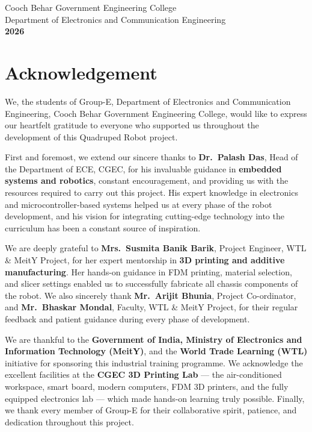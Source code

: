 \documentclass[12pt, a4paper]{article}
\begin{document}
\begin{center}
\vspace{0.3cm}
{\small Cooch Behar Government Engineering College}\\[2pt]
{\small Department of Electronics and Communication Engineering}\\[4pt]
{\normalsize\bfseries 2026}

\end{center}
\newpage
\thispagestyle{fancy}

\section*{\color{myred}Acknowledgement}

We, the students of Group-E, Department of Electronics and Communication
Engineering, Cooch Behar Government Engineering College, would like to express
our heartfelt gratitude to everyone who supported us throughout the development
of this Quadruped Robot project.

First and foremost, we extend our sincere thanks to \textbf{Dr.\ Palash Das},
Head of the Department of ECE, CGEC, for his invaluable guidance in
\textbf{embedded systems and robotics}, constant encouragement, and providing
us with the resources required to carry out this project. His expert knowledge
in electronics and microcontroller-based systems helped us at every phase of
the robot development, and his vision for integrating cutting-edge technology
into the curriculum has been a constant source of inspiration.

We are deeply grateful to \textbf{Mrs.\ Susmita Banik Barik}, Project Engineer,
WTL \& MeitY Project, for her expert mentorship in \textbf{3D printing and
additive manufacturing}. Her hands-on guidance in FDM printing, material
selection, and slicer settings enabled us to successfully fabricate all
chassis components of the robot. We also sincerely thank
\textbf{Mr.\ Arijit Bhunia}, Project Co-ordinator, and \textbf{Mr.\ Bhaskar
Mondal}, Faculty, WTL \& MeitY Project, for their regular feedback and patient
guidance during every phase of development.

We are thankful to the \textbf{Government of India, Ministry of Electronics and
Information Technology (MeitY)}, and the \textbf{World Trade Learning (WTL)}
initiative for sponsoring this industrial training programme. We acknowledge the
excellent facilities at the \textbf{CGEC 3D Printing Lab} --- the air-conditioned
workspace, smart board, modern computers, FDM 3D printers, and the fully equipped
electronics lab --- which made hands-on learning truly possible. Finally, we thank
every member of Group-E for their collaborative spirit, patience, and dedication
throughout this project.
\end{document}
